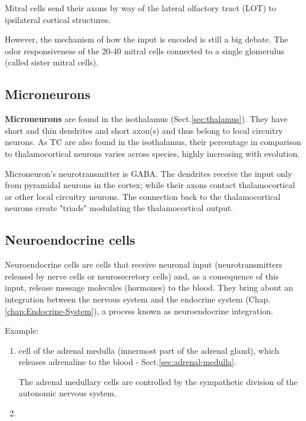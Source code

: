 Mitral cells send their axons by way of the lateral olfactory tract (LOT) to
ipsilateral cortical structures.
 
 
However, the mechanism of how the input is encoded is still a big debate. The
odor responsiveness of the 20-40 mitral cells connected to a single glomerulus
(called sister mitral cells).




\subsection{Microneurons}
\label{sec:microneurons}

{\bf Microneurons} are found in the isothalamus (Sect.\ref{sec:thalamus}).
They have short and thin dendrites and short axon(s) and thus belong to local
circuitry neurons. As TC are also found in the isothalamus, their percentage in
comparison to thalamocortical neurons varies across species, highly increasing
with evolution.

Microneuron's neurotransmitter is GABA. The dendrites receive the input only
from pyramidal neurons in the cortex; while their axons contact thalamocortical
or other local circuitry neurons.
The connection back to the thalamocortical neurons create "triads" modulating
the thalamocortical output.

\subsection{Neuroendocrine cells}
\label{sec:neuroendocrine-cell}

Neuroendocrine cells are cells that receive neuronal input (neurotransmitters
released by nerve cells or neurosecretory cells) and, as a consequence of this
input, release message molecules (hormones) to the blood.
They  bring about an integration between the nervous system and the endocrine
system (Chap.\ref{chap:Endocrine-System}), a process known as neuroendocrine
integration.

Example:
\begin{enumerate}
  \item  cell of the adrenal medulla (innermost part of the adrenal gland),
  which releases adrenaline to the blood - Sect.\ref{sec:adrenal-medulla}. 
  
  The adrenal medullary cells are controlled by the sympathetic division of the
  autonomic nervous system. 
  
  \item 
\end{enumerate}

